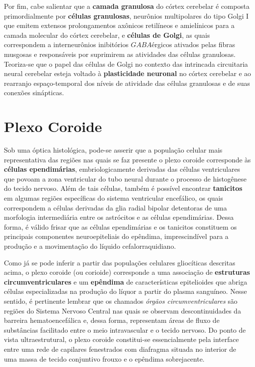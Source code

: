 \documentclass[
]{book}
\begin{document}
Por fim, cabe salientar que a \textbf{camada granulosa} do córtex cerebelar é composta primordialmente por \textbf{células granulosas}, neurônios multipolares do tipo Golgi I que emitem extensos prolongamentos axônicos retilíneos e amielínicos para a camada molecular do córtex cerebelar, e \textbf{células de Golgi}, as quais correspondem a interneurônios inibitórios \(GABA\)érgicos ativados pelas fibras musgosas e responsáveis por suprimirem as atividades das células granulosas. Teoriza-se que o papel das células de Golgi no contexto das intrincada circuitaria neural cerebelar esteja voltado à \textbf{plasticidade neuronal} no córtex cerebelar e ao rearranjo espaço-temporal dos níveis de atividade das células granulosas e de suas conexões sinápticas.

\hypertarget{plexo-coroide}{%
\chapter{Plexo Coroide}\label{plexo-coroide}}

Sob uma óptica histológica, pode-se asserir que a população celular mais representativa das regiões nas quais se faz presente o plexo coroide corresponde às \textbf{células ependimárias}, embriologicamente derivadas das células ventriculares que povoam a zona ventricular do tubo neural durante o processo de histogênese do tecido nervoso. Além de tais células, também é possível encontrar \textbf{tanicitos} em algumas regiões específicas do sistema ventricular encefálico, os quais correspondem a células derivadas da glia radial bipolar detentoras de uma morfologia intermediária entre os astrócitos e as células ependimárias. Dessa forma, é válido frisar que as células ependimárias e os tanicitos constituem os principais componentes neuroepiteliais do epêndima, imprescindível para a produção e a movimentação do líquido cefalorraquidiano.

Como já se pode inferir a partir das populações celulares gliocíticas descritas acima, o plexo coroide (ou corioide) corresponde a uma associação de \textbf{estruturas circumventriculares} e um \textbf{epêndima} de características epitelioides que abriga células especializadas na produção do líquor a partir do plasma sanguíneo. Nesse sentido, é pertinente lembrar que os chamados \emph{órgãos circumventriculares} são regiões do Sistema Nervoso Central nas quais se observam descontinuidades da barreira hematoencefálica e, dessa forma, representam áreas de fluxo de substâncias facilitado entre o meio intravascular e o tecido nervoso. Do ponto de vista ultraestrutural, o plexo coroide constitui-se essencialmente pela interface entre uma rede de capilares fenestrados com diafragma situada no interior de uma massa de tecido conjuntivo frouxo e o epêndima sobrejacente.
\end{document}
